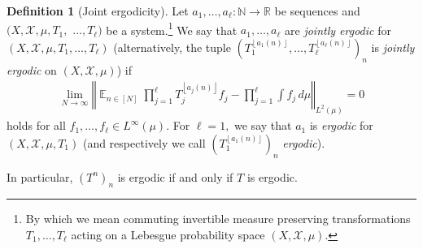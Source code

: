 \documentclass[11pt]{amsart}
\theoremstyle{definition}
\newtheorem{definition}[lemma]{Definition}
\DeclareMathOperator*{\E}{\mathbb{E}}
\newcommand{\N}{{\mathbb N}}
\newcommand{\R}{{\mathbb R}}
\newcommand{\CX}{{\mathcal X}}
\newcommand{\norm}[1]{\left\Vert #1\right\Vert}
\newcommand{\1}{{\mathbf{1}}}
\newcommand{\floor}[1]{{\left \lfloor #1 \right \rfloor}}
\begin{document}
\begin{definition}[Joint ergodicity]\label{D: joint ergodicity}
    Let $a_1, \ldots, a_\ell:\N\to\R$ be sequences and $(X, \CX, \mu, T_1,$ $ \ldots, T_\ell)$ be a system.\footnote{By which we mean commuting invertible measure preserving transformations $T_1, \ldots, T_\ell$ acting on a Lebesgue probability space $(X, \CX, \mu)$.} We say that $a_1, \ldots, a_\ell$ are \textit{jointly ergodic} for $(X, \CX, \mu, T_1, \ldots, T_\ell)$ (alternatively, the tuple $(T_1^{\floor{a_1(n)}}, \ldots, T_\ell^{\floor{a_\ell(n)}})_n$ is \textit{jointly ergodic} on $(X, \CX, \mu)$) if
\begin{align}\label{E: joint ergodicity}
        \lim_{N\to\infty}\norm{\E_{n\in[N]}\prod_{j=1}^\ell T_j^{\floor{a_{j}(n)}}f_j - \prod_{j=1}^\ell \int f_j\, d\mu}_{L^2(\mu)} = 0
    \end{align}
    holds for all $f_1, \ldots, f_\ell\in L^\infty(\mu)$. {For $\ell=1,$ we say that $a_1$ is \emph{ergodic} for $(X, \CX, \mu, T_1)$ (and respectively we call $(T_1^{\floor{a_1(n)}})_n$ \emph{ergodic}).}
\end{definition}

In particular, $(T^n)_n$ is ergodic if and only if $T$ is ergodic.
\end{document}
